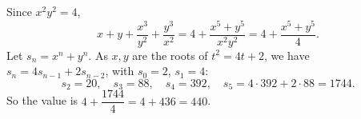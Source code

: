 Since $x^2y^2=4$,
\[x+y+\dfrac{x^3}{y^2}+\dfrac{y^3}{x^2}=4+\dfrac{x^5+y^5}{x^2y^2}=4+\dfrac{x^5+y^5}{4}.\]
Let $s_n=x^n+y^n$. As $x,y$ are the roots of $t^2=4t+2$, we have $s_n=4s_{n-1}+2s_{n-2}$, with $s_0=2$, $s_1=4$:
\[s_2=20,\quad s_3=88,\quad s_4=392,\quad s_5=4\cdot392+2\cdot88=1744.\]
So the value is $4+\dfrac{1744}{4}=4+436=\boxed{440}$.
